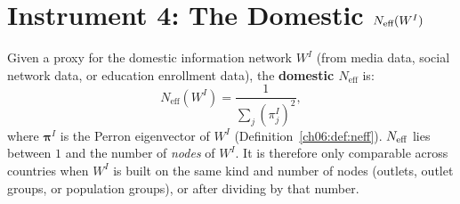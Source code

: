 \documentclass[../structural_economics_book.tex]{subfiles}
\begin{document}
\section{Instrument 4: The Domestic $N_{\text{eff}}(W^I)$}
\label{ch17:sec:neff}

\begin{definition}\label{ch17:def:domestic_neff}
Given a proxy for the domestic information network $W^I$ (from media data, social network data, or education enrollment data), the \textbf{domestic $N_{\text{eff}}$} is:
\begin{equation}\label{ch17:eq:domestic_neff}
N_{\text{eff}}(W^I) = \frac{1}{\sum_j (\pi^I_j)^2},
\end{equation}
where $\boldsymbol{\pi}^I$ is the Perron eigenvector of $W^I$ (Definition~\ref{ch06:def:neff}). $N_{\text{eff}}$ lies between $1$ and the number of \emph{nodes} of $W^I$. It is therefore only comparable across countries when $W^I$ is built on the same kind and number of nodes (outlets, outlet groups, or population groups), or after dividing by that number.
\end{definition}
\end{document}
